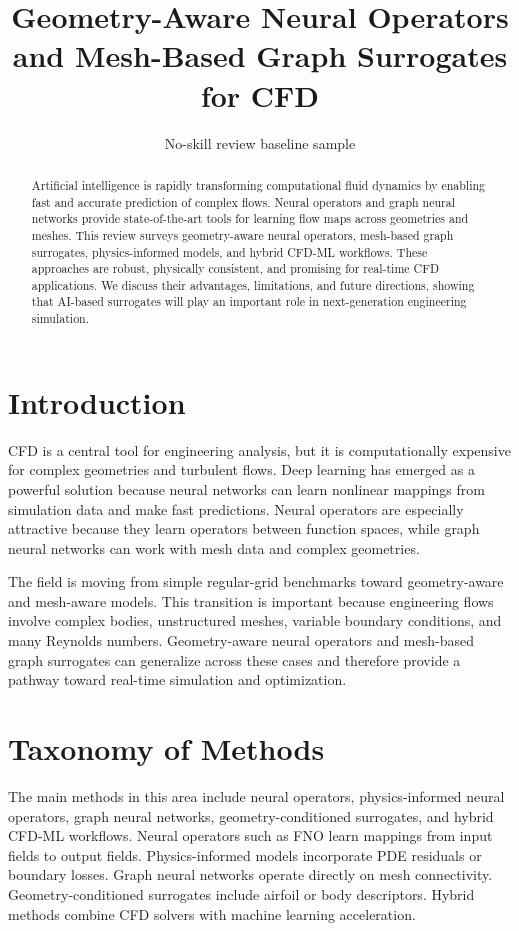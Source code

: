 \documentclass[11pt]{article}
\title{Geometry-Aware Neural Operators and Mesh-Based Graph Surrogates for CFD}
\author{No-skill review baseline sample}
\date{}
\begin{document}
\maketitle

\begin{abstract}
Artificial intelligence is rapidly transforming computational fluid dynamics by enabling fast and accurate prediction of complex flows. Neural operators and graph neural networks provide state-of-the-art tools for learning flow maps across geometries and meshes. This review surveys geometry-aware neural operators, mesh-based graph surrogates, physics-informed models, and hybrid CFD-ML workflows. These approaches are robust, physically consistent, and promising for real-time CFD applications. We discuss their advantages, limitations, and future directions, showing that AI-based surrogates will play an important role in next-generation engineering simulation.
\end{abstract}

\section{Introduction}
CFD is a central tool for engineering analysis, but it is computationally expensive for complex geometries and turbulent flows. Deep learning has emerged as a powerful solution because neural networks can learn nonlinear mappings from simulation data and make fast predictions. Neural operators are especially attractive because they learn operators between function spaces, while graph neural networks can work with mesh data and complex geometries.

The field is moving from simple regular-grid benchmarks toward geometry-aware and mesh-aware models. This transition is important because engineering flows involve complex bodies, unstructured meshes, variable boundary conditions, and many Reynolds numbers. Geometry-aware neural operators and mesh-based graph surrogates can generalize across these cases and therefore provide a pathway toward real-time simulation and optimization.

\section{Taxonomy of Methods}
The main methods in this area include neural operators, physics-informed neural operators, graph neural networks, geometry-conditioned surrogates, and hybrid CFD-ML workflows. Neural operators such as FNO learn mappings from input fields to output fields. Physics-informed models incorporate PDE residuals or boundary losses. Graph neural networks operate directly on mesh connectivity. Geometry-conditioned surrogates include airfoil or body descriptors. Hybrid methods combine CFD solvers with machine learning acceleration.
\end{document}
